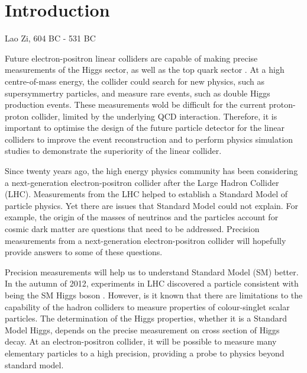 \chapter{Introduction}
\label{chap:Introduction}



%
{Lao Zi, 604 BC - 531 BC}%



Future electron-positron linear colliders are capable of making precise measurements of the Higgs sector, as well as the top quark sector \cite{Brau:2007zza,Linssen:2012hp}. At a high centre-of-mass energy, the collider could search for new physics, such as supersymmertry particles, and  measure rare events, such as double Higgs production events. These measurements wold be difficult for the current proton-proton collider, limited by the underlying QCD interaction. Therefore, it is important to optimise the design of the future particle detector for the linear colliders to improve the event reconstruction and to perform physics simulation studies to demonstrate the superiority of the linear collider.


Since twenty years ago, the high energy physics community has been considering a next-generation electron-positron collider after the Large Hadron Collider (LHC). Measurements from the LHC helped to establish a Standard Model of particle physics. Yet there are issues that Standard Model could not explain. For example, the origin of the masses of neutrinos and the particles account for cosmic dark matter are questions that need to be addressed. Precision measurements from a next-generation electron-positron collider will hopefully provide answers to some of these questions.

Precision measurements will help us to understand Standard Model (SM) better. In the autumn of 2012, experiments in LHC discovered a particle consistent with being the SM Higgs boson \cite{Aad:2012tfa,Chatrchyan:2012ufa}. However, is it known that there are limitations to the capability of the hadron colliders to measure properties of colour-singlet scalar particles. The determination of the Higgs properties, whether it is a Standard Model Higgs, depends on the precise measurement on cross section of Higgs decay. At an electron-positron collider, it will be possible to measure many elementary particles to a high precision\cite{Abramowicz:2013tzc}, providing a probe to physics beyond standard model.



